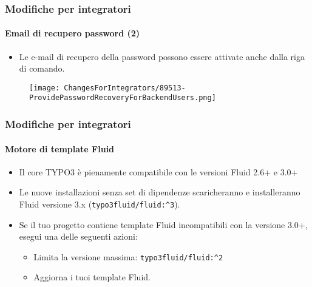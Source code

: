 
\begin{frame}[fragile]
	\frametitle{Modifiche per integratori}
	\framesubtitle{Email di recupero password (2)}

	\begin{itemize}
		\item Le e-mail di recupero della password possono essere attivate anche dalla riga di comando.
	\end{itemize}

	\begin{figure}
		\texttt{[image: ChangesForIntegrators/89513-ProvidePasswordRecoveryForBackendUsers.png]}
	\end{figure}

\end{frame}


\begin{frame}[fragile]
	\frametitle{Modifiche per integratori}
	\framesubtitle{Motore di template Fluid}

	\begin{itemize}
		\item Il core TYPO3 è pienamente compatibile con le versioni Fluid 2.6+ e 3.0+
		\item Le nuove installazioni senza set di dipendenze scaricheranno e installeranno Fluid versione 3.x
			(\texttt{typo3fluid/fluid:\^{}3}).
		\item Se il tuo progetto contiene template Fluid incompatibili con la versione 3.0+, esegui una delle seguenti azioni:

			\begin{itemize}
				\item Limita la versione massima: \texttt{typo3fluid/fluid:\^{}2}
				\item Aggiorna i tuoi template Fluid.
			\end{itemize}

	\end{itemize}

\end{frame}


